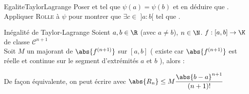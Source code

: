 \documentclass[12pt,a4paper]{report}
\begin{document}
\begin{principedemo}{EgaliteTaylorLagrange}
Poser  et  tel que $\psi(a) = \psi(b)$ et en déduire que . Appliquer \textsc{Rolle} à $\psi$ pour montrer que $\exists c \in \; ]a:b[$ tel que .
\end{principedemo}

\begin{theoreme}{Inégalité de Taylor-Lagrange}{}
Soient $a,b\in \R$ (avec $a\neq b$), $n \in \N$. $f:[a,b] \to \K$ de classe $\mathcal{C}^{n+1}$\\
Soit $M$ un majorant de $\abs{f^{(n+1)}}$ sur $[a,b]$ ( existe car $\abs{f^{(n+1)}}$ est réelle et continue sur le segment d'extrémités $a$ et $b$ ), alors :
\begin{center}
\end{center}
De façon équivalente, on peut écrire  avec $\abs{R_n} \le M \dfrac{\abs{b-a}^{n+1}}{(n+1)!}$
\end{theoreme}
\end{document}
